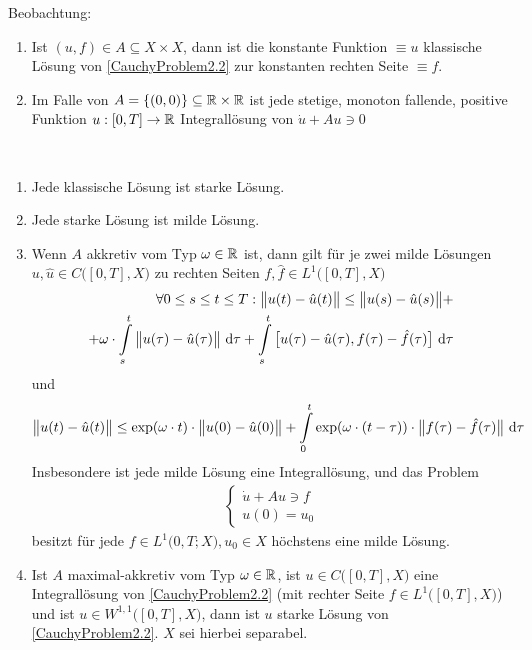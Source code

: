 Beobachtung:
\begin{enumerate}[label=(\alph*)]
	\item Ist $(u,f)\in A\subseteq X\times X$, dann ist die konstante Funktion $\equiv u$ klassische Lösung von \eqref{CauchyProblem2.2} zur konstanten rechten Seite $\equiv f$.
	\item Im Falle von $A=\lbrace(0,0)\rbrace\subseteq\mathbb{R}\times\mathbb{R}$ ist jede stetige, monoton fallende, positive Funktion $u:[0,T]\to\mathbb{R}$ %
Integrallösung von $\dot{u}+Au\ni 0$
\end{enumerate}

\begin{theorem}\
	\begin{enumerate}[label=(\alph*)]
		\item Jede klassische Lösung ist starke Lösung.
		\item Jede starke Lösung ist milde Lösung.
		\item Wenn $A$ akkretiv vom Typ $\omega\in\mathbb{R}$ ist, dann gilt für je zwei milde Lösungen $u,\hat{u}\in C\big([0,T],X\big)$ zu rechten Seiten $f,\hat{f}\in L^1\big([0,T],X\big)$
		\begin{align*}
			\forall 0\leq s\leq t\leq T:
			\big\Vert u(t)-\hat{u}(t)\big\Vert\leq\big\Vert u(s)-\hat{u}(s)\big\Vert+\\+\omega\cdot\int\limits_s^t\big\Vert u(\tau)-\hat{u}(\tau)\big\Vert\text{ d}\tau+\int\limits_s^t\big[u(\tau)-\hat{u}(\tau),f(\tau)-\hat{f}(\tau)\big]\text{ d}\tau
		\end{align*}
		und 
		\begin{align*}
			\big\Vert u(t)-\hat{u}(t)\big\Vert\leq\exp(\omega\cdot t)\cdot\big\Vert u(0)-\hat{u}(0)\big\Vert+\int\limits_0^t\exp(\omega\cdot(t-\tau))\cdot\big\Vert f(\tau)-\hat{f}(\tau)\big\Vert\text{ d}\tau
		\end{align*}
		Insbesondere ist jede milde Lösung eine Integrallösung, und das Problem 
		\begin{align*}
			\left\lbrace\begin{array}{c}
				\dot{u}+Au\ni f\\
				u(0)=u_0
			\end{array}\right.
		\end{align*}
		besitzt für jede $f\in L^1\big(0,T;X),u_0\in X$ höchstens eine milde Lösung.
		\item Ist $A$ maximal-akkretiv vom Typ $\omega\in\mathbb{R}$, ist $u\in C\big([0,T],X)$ eine Integrallösung von \eqref{CauchyProblem2.2} 
		(mit rechter Seite $f\in L^1\big([0,T],X\big)$) und ist $u\in W^{1,1}\big([0,T],X\big)$, dann ist $u$ starke Lösung von \eqref{CauchyProblem2.2}. 
		$X$ sei hierbei separabel.
	\end{enumerate}
\end{theorem}

